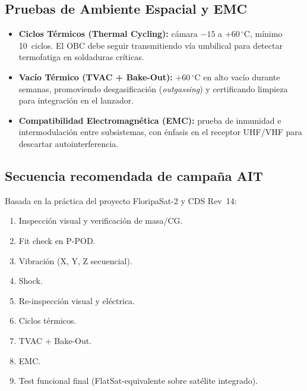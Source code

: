\subsection{Pruebas de Ambiente Espacial y EMC}
\begin{itemize}
    \item \textbf{Ciclos Térmicos (Thermal Cycling):} cámara $-15$ a $+60\,^\circ$C, mínimo 10~ciclos. El OBC debe seguir transmitiendo vía umbilical para detectar termofatiga en soldaduras críticas.

    \item \textbf{Vacío Térmico (TVAC + Bake-Out):} $+60\,^\circ$C en alto vacío durante semanas, promoviendo desgasificación (\textit{outgassing}) y certificando limpieza para integración en el lanzador.

    \item \textbf{Compatibilidad Electromagnética (EMC):} prueba de inmunidad e intermodulación entre subsistemas, con énfasis en el receptor UHF/VHF para descartar autointerferencia.
\end{itemize}

\subsection{Secuencia recomendada de campaña AIT}
Basada en la práctica del proyecto FloripaSat-2 y CDS Rev~14:
\begin{enumerate}
    \item Inspección visual y verificación de masa/CG.
    \item Fit check en P-POD.
    \item Vibración (X, Y, Z secuencial).
    \item Shock.
    \item Re-inspección visual y eléctrica.
    \item Ciclos térmicos.
    \item TVAC + Bake-Out.
    \item EMC.
    \item Test funcional final (FlatSat-equivalente sobre satélite integrado).
\end{enumerate}
